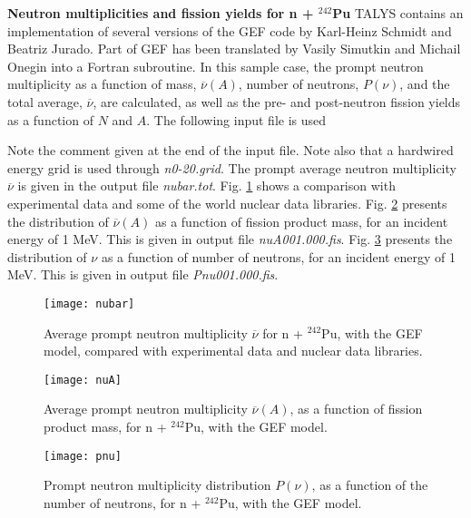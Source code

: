 \begin{samplecase}
{\bf Neutron multiplicities and fission yields for n + ${}^{242}$Pu}\newline
TALYS contains an implementation of several versions of the GEF code by Karl-Heinz Schmidt and Beatriz Jurado. Part of GEF has been translated by Vasily Simutkin and Michail Onegin into a Fortran subroutine.
In this sample case, the prompt neutron multiplicity as a function of mass, 
$\overline{\nu}(A)$, number of neutrons, $P({\nu})$, and the total average,
$\overline{\nu}$,
are calculated, as well as the pre- and post-neutron fission yields as a 
function of $N$ and $A$.
The following input file is used


Note the comment given at the end of the input file. Note also that a hardwired energy grid is used through {\it n0-20.grid}. The prompt average neutron 
multiplicity $\overline{\nu}$ is given in the output file {\it nubar.tot}. 
Fig. \ref{nubar} shows a comparison with experimental data and some of the 
world nuclear data libraries.
Fig. \ref{nuA} presents the distribution of $\overline{\nu}(A)$ as a function of fission product mass, for an incident energy of 1 MeV. This is given in output 
file {\it nuA001.000.fis}.
Fig. \ref{pnu} presents the distribution of $\nu$ as a function of number of neutrons, for an incident energy of 1 MeV. This is given in output 
file {\it Pnu001.000.fis}.
\end{samplecase}
\begin{figure}
\centering\texttt{[image: nubar]}
\caption{Average prompt neutron multiplicity $\overline{\nu}$ for n + $^{242}$Pu, with the GEF model, compared with experimental data and nuclear data libraries.}
\label{nubar}
\end{figure}
\begin{figure}
\centering\texttt{[image: nuA]}
\caption{Average prompt neutron multiplicity $\overline{\nu}(A)$, as a function of fission product mass, for n + $^{242}$Pu, with the GEF model.}
\label{nuA}
\end{figure}
\begin{figure}
\centering\texttt{[image: pnu]}
\caption{Prompt neutron multiplicity distribution $P(\nu )$, as a function of 
the number of neutrons, for n + $^{242}$Pu, with the GEF model.}
\label{pnu}
\end{figure}
